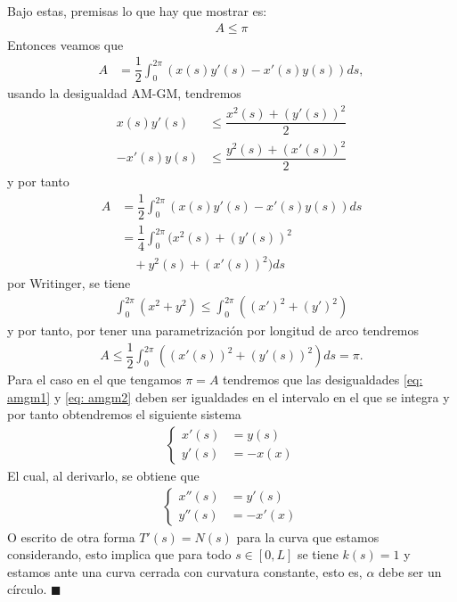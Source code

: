 \documentclass[oneside,11pt]{memoir}
\begin{document}
Bajo estas, premisas lo que hay que mostrar es:
\begin{align*}
    A\leq \pi
\end{align*}
Entonces veamos que
\begin{align*}
    A&=\dfrac{1}{2}\int_{0}^{2\pi}(x(s)y'(s)-x'(s)y(s))ds,
\end{align*}
usando la desigualdad AM-GM, tendremos
\begin{align}
    x(s)y'(s)&\leq \dfrac{x^2(s)+(y'(s))^2}{2}\label{eq: amgm1}\\
    -x'(s)y(s)&\leq \dfrac{y^2(s)+(x'(s))^2}{2}\label{eq: amgm2}
\end{align}
y por tanto
\begin{align*}
    A&=\dfrac{1}{2}\int_{0}^{2\pi}(x(s)y'(s)-x'(s)y(s))ds\\
     &=\dfrac{1}{4}\int_{0}^{2\pi}(x^2(s)+(y'(s))^2\\ &\quad+y^2(s)+(x'(s))^2)ds
\end{align*}
por Writinger, se tiene
\begin{align*}
    \int_{0}^{2\pi}(x^2+y^2)\leq \int_{0}^{2\pi}((x')^2+(y')^2)
\end{align*}
y por tanto, por tener una parametrización por longitud de arco tendremos
\begin{align*}
    A\leq\dfrac{1}{2}\int_0^{2\pi}((x'(s))^2+(y'(s))^2)ds=\pi.
\end{align*}
Para el caso en el que tengamos $\pi=A$ tendremos que las desigualdades \ref{eq: amgm1} y \ref{eq: amgm2} deben ser igualdades en el intervalo en el que se integra y por tanto obtendremos el siguiente sistema
\begin{align*}
\left\{
\begin{array}{cl}
    x'(s)&=y(s)\\
    y'(s)&=-x(x)
\end{array}
\right.
\end{align*}
El cual, al derivarlo, se obtiene que
\begin{align*}
    \left\{
\begin{array}{cl}
    x''(s)&=y'(s)\\
    y''(s)&=-x'(x)
\end{array}
\right.
\end{align*}
O escrito de otra forma $T'(s)=N(s)$ para la curva que estamos considerando, esto implica que para todo $s\in [0,L]$ se tiene $k(s)=1$ y estamos ante una curva cerrada con curvatura constante, esto es, $\alpha$ debe ser un círculo.
\hfill $\blacksquare$\\
\end{document}

